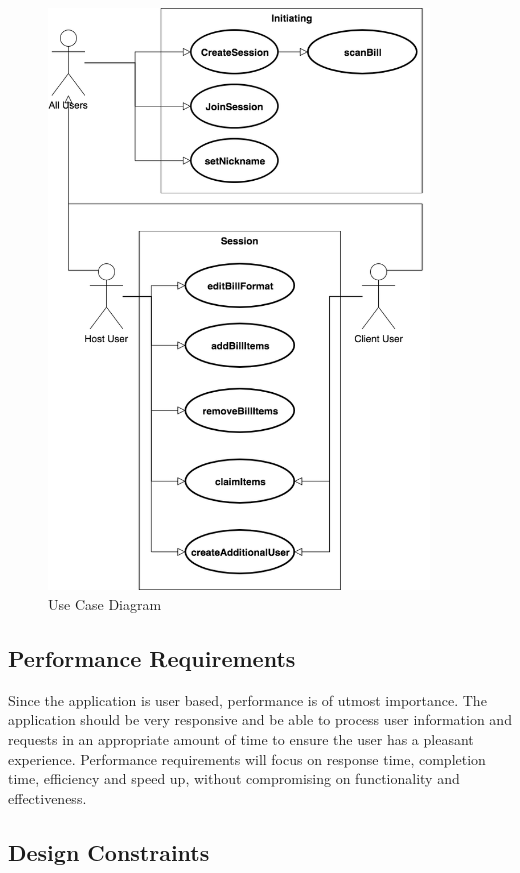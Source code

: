 \documentclass[12pt,a4paper]{article}
\begin{document}
			\begin{figure}[H]  
			  \includegraphics[width=0.9\textwidth]{diagrams/use case.png}
			   \vspace{0.1cm}
			    \caption{Use Case Diagram}
			    \label{Use Case Diagram}
			\end{figure}

	\subsection{Performance Requirements}
		Since the application is user based, performance is of utmost importance. The application should be very responsive and be able to process user information and requests in an appropriate amount of time to ensure the user has a pleasant experience. Performance requirements will focus on response time, completion time, efficiency and speed up, without compromising on functionality and effectiveness. 
	\subsection{Design Constraints}
\end{document}

